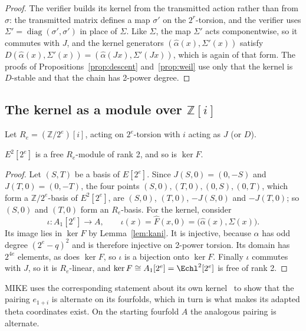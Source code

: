 \begin{proof}
    The verifier builds its kernel from the transmitted action rather than
    from $\sigma$: the transmitted matrix defines a map $\sigma'$ on the
    $2^r$-torsion, and the verifier uses $\Sigma' = \operatorname{diag}(\sigma',
    \sigma')$ in place of $\Sigma$. Like $\Sigma$, the map $\Sigma'$ acts
    componentwise, so it commutes with $J$, and the kernel generators
    $(\widehat{\alpha}(x), \Sigma'(x))$ satisfy $D(\widehat{\alpha}(x),
    \Sigma'(x)) = (\widehat{\alpha}(Jx), \Sigma'(Jx))$, which is again of that
    form. The proofs of Propositions~\ref{prop:descent} and~\ref{prop:weil} use
    only that the kernel is $D$-stable and that the chain has 2-power degree.
\end{proof}

\subsection{The kernel as a module over \texorpdfstring{$\mathbb{Z}[i]$}{Z[i]}}

Let $R_e = (\mathbb{Z}/2^e)[i]$, acting on $2^e$-torsion with $i$ acting as
$J$ (or $D$).

\begin{lemma}
    \label{lem:free}
    $E^2[2^e]$ is a free $R_e$-module of rank 2, and so is $\ker F$.
\end{lemma}

\begin{proof}
    Let $(S, T)$ be a basis of $E[2^e]$. Since $J(S, 0) = (0, -S)$ and
    $J(T, 0) = (0, -T)$, the four points
    $(S, 0), (T, 0), (0, S), (0, T)$, which form a $\mathbb{Z}/2^e$-basis of
    $E^2[2^e]$, are $(S, 0)$, $(T, 0)$, $-J(S, 0)$ and $-J(T, 0)$; so $(S, 0)$ and $(T, 0)$ form an $R_e$-basis. For the kernel,
    consider
    \[
    \iota \colon A_1[2^e] \to A, \qquad
    \iota(x) = \widehat{F}(x, 0) = \bigl(\widehat{\alpha}(x), \Sigma(x)\bigr).
    \]
    Its image lies in $\ker F$ by
    Lemma~\ref{lem:kani}. It is injective, because $\widehat{\alpha}$ has odd
    degree $(2^e - q)^2$ and is therefore injective on 2-power torsion. Its
    domain has $2^{4e}$ elements, as does $\ker F$, so $\iota$ is a bijection
    onto $\ker F$. Finally $\iota$ commutes with $J$, so it is $R_e$-linear, and
    $\ker F \cong A_1[2^e] = \Echl^2[2^e]$ is free of rank 2.
\end{proof}

MIKE uses the corresponding statement about its own kernel~\cite[proof of
Corollary G.1]{BDD+26} to show that the pairing $e_{1+i}$ is alternate on
its fourfolds, which in turn is what makes its adapted theta coordinates
exist. On the starting fourfold $A$ the analogous pairing is alternate.

